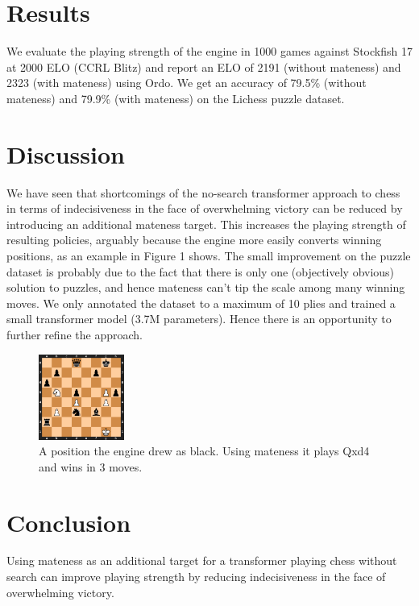 \documentclass{article}
\begin{document}
\begin{multicols}{2}
\section{Results}

We evaluate the playing strength of the engine in 1000 games against Stockfish 17 at 2000 ELO (CCRL Blitz) and report an ELO of 2191 (without mateness) and 2323 (with mateness) using Ordo. We get an accuracy of 79.5\% (without mateness) and 79.9\% (with mateness) on the Lichess puzzle dataset.

\section{Discussion}

We have seen that shortcomings of the no-search transformer approach to chess in terms of indecisiveness in the face of overwhelming victory can be reduced by introducing an additional mateness target. This increases the playing strength of resulting policies, arguably because the engine more easily converts winning positions, as an example in Figure 1 shows. The small improvement on the puzzle dataset is probably due to the fact that there is only one (objectively obvious) solution to puzzles, and hence mateness can't tip the scale among many winning moves. We only annotated the dataset to a maximum of 10 plies and trained a small transformer model (3.7M parameters). Hence there is an opportunity to further refine the approach.

\begin{figure}[H]
  	\centering
    \includegraphics[width=0.25\textwidth]{example.png}
    \caption{A position the engine drew as black. Using mateness it plays Qxd4 and wins in 3 moves.}
\end{figure}

\section{Conclusion}

Using mateness as an additional target for a transformer playing chess without search can improve playing strength by reducing indecisiveness in the face of overwhelming victory.

 


\end{multicols}
\end{document}
